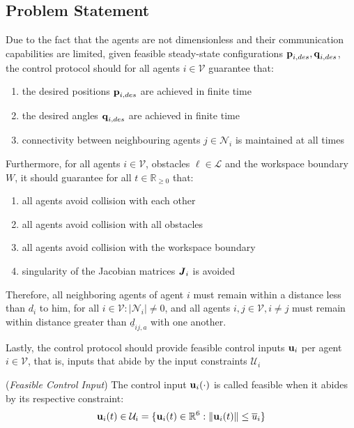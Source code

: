 \subsection{Problem Statement}

Due to the fact that the agents are not dimensionless and their communication
capabilities are limited, given feasible steady-state configurations
$\bm{\mathbf{p}}_{i,des}, \bm{\mathbf{q}}_{i,des}$, the control protocol should for all
agents $i \in \mathcal{V}$ guarantee that:
\begin{enumerate}
  \item the desired positions $\bm{\mathbf{p}}_{i,des}$ are achieved in finite time
  \item the desired angles $\bm{\mathbf{q}}_{i,des}$ are achieved in finite time
  \item connectivity between neighbouring agents $j \in \mathcal{N}_i$ is
    maintained at all times
\end{enumerate}
Furthermore, for all agents $i \in \mathcal{V}$, obstacles $\ell \in \mathcal{L}$
and the workspace boundary $W$, it should guarantee for all
$t\in\mathbb{R}_{\geq 0}$ that:
\begin{enumerate}
  \item all agents avoid collision with each other
  \item all agents avoid collision with all obstacles
  \item all agents avoid collision with the workspace boundary
  \item singularity of the Jacobian matrices $\bm{\mathit{J}}_i$ is avoided
\end{enumerate}

Therefore, all neighboring agents of agent $i$ must remain within a distance
less than $d_i$ to him, for all $i \in \mathcal{V}: |\mathcal{N}_i| \not= 0$,
and all agents $i, j\in \mathcal{V}, i \neq j$ must remain within distance
greater than $\underline{d}_{ij,a}$ with one another.

Lastly, the control protocol should provide feasible control inputs $\bm{\mathbf{u}}_i$
per agent $i \in \mathcal{V}$, that is, inputs that abide by the input
constraints $\mathcal{U}_i$

\begin{bw_box}
  \begin{definition} (\textit{Feasible Control Input})
    \label{definition:feasible_control_input}
    The control input $\bm{\mathbf{u}}_i (\cdot)$ is called feasible when it abides
    by its respective constraint:
  \begin{align}
    \bm{\mathbf{u}}_i(t) \in \mathcal{U}_i = \{ \bm{\mathbf{u}}_i(t) \in \mathbb{R}^6 : \|\bm{\mathbf{u}}_i (t)\| \leq \overline{u}_i\}
  \end{align}

\end{definition}
\end{bw_box}
\newpage

